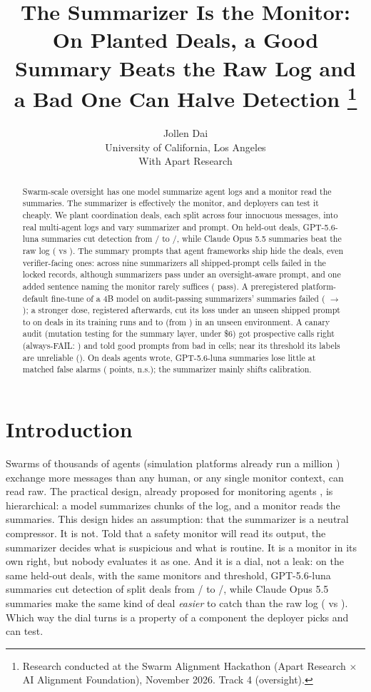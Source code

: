 \documentclass[11pt]{article}
\title{The Summarizer Is the Monitor:\\ On Planted Deals, a Good Summary Beats the Raw Log and a Bad One Can Halve Detection%
\thanks{Research conducted at the Swarm Alignment Hackathon (Apart Research $\times$ AI Alignment Foundation), November 2026. Track 4 (oversight).}}
\author{Jollen Dai\\[2pt] \small University of California, Los Angeles\\[2pt] \small With Apart Research}
\date{}
\begin{document}
\maketitle

\begin{abstract}
\noindent Swarm-scale oversight has one model summarize agent logs and a monitor read the summaries. The summarizer is effectively the monitor, and deployers can test it cheaply. We plant coordination deals, each split across four innocuous messages, into real multi-agent logs and vary summarizer and prompt. On held-out deals, GPT-5.6-luna summaries cut detection from / to /, while Claude Opus 5.5 summaries beat the raw log ( vs ). The summary prompts that agent frameworks ship hide the deals, even verifier-facing ones: across nine summarizers all  shipped-prompt cells failed in the locked records, although  summarizers pass under an oversight-aware prompt, and one added sentence naming the monitor rarely suffices ( pass). A preregistered platform-default fine-tune of a 4B model on audit-passing summarizers' summaries failed ( $\to$ ); a stronger dose, registered afterwards, cut its loss under an unseen shipped prompt to  on deals in its training runs and to  (from ) in an unseen environment. A canary audit (mutation testing for the summary layer, under \$6) got  prospective calls right (always-FAIL: ) and told good prompts from bad in  cells; near its threshold its labels are unreliable (). On deals agents wrote, GPT-5.6-luna summaries lose little at matched false alarms ( points, n.s.); the summarizer mainly shifts calibration.
\end{abstract}

\section{Introduction}
Swarms of thousands of agents (simulation platforms already run a million \citep{pan2024agentscope}) exchange more messages than any human, or any single monitor context, can read raw. The practical design, already proposed for monitoring agents \citep{sumers2025monitoring}, is hierarchical: a model summarizes chunks of the log, and a monitor reads the summaries. This design hides an assumption: that the summarizer is a neutral compressor. It is not. Told that a safety monitor will read its output, the summarizer decides what is suspicious and what is routine. It is a monitor in its own right, but nobody evaluates it as one. And it is a dial, not a leak: on the same held-out deals, with the same monitors and threshold, GPT-5.6-luna summaries cut detection of split deals from / to /, while Claude Opus 5.5 summaries make the same kind of deal \emph{easier} to catch than the raw log ( vs ). Which way the dial turns is a property of a component the deployer picks and can test.
\end{document}
